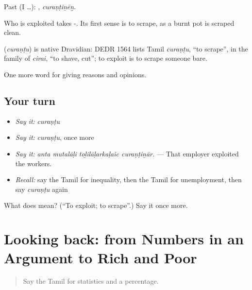 Past (I …): , \emph{curaṇṭiṉēṉ}.

Who is exploited takes -. Its first sense is to scrape, as a burnt pot is scraped clean.

\begin{cousinweb}
\textbf{} (\emph{curaṇṭu}) is native Dravidian: DEDR 1564 lists Tamil \emph{curaṇṭu}, \textquotedblleft{}to scrape\textquotedblright{}, in the family of \emph{cirai}, \textquotedblleft{}to shave, cut\textquotedblright{}; to exploit is to scrape someone bare.
\end{cousinweb}

\begin{grammarlens}[title={What you've built}]
One more word for giving reasons and opinions.
\end{grammarlens}

\subsection*{Your turn}
\begin{itemize}
\raggedright
  \item \emph{Say it:} \emph{curaṇṭu}
  \item \emph{Say it:} \emph{curaṇṭu}, once more
  \item \emph{Say it:} \emph{anta mutalāḷi toḻilāḷarkaḷaic curaṇṭiṉār.} — That employer exploited the workers.
  \item \emph{Recall:} say the Tamil for inequality, then the Tamil for unemployment, then say \emph{curaṇṭu} again
\end{itemize}

\begin{tcolorbox}[breakable,colback=teal!4,colframe=teal!35!black,title={Before you move on}]
What does  mean? (\textquotedblleft{}To exploit; to scrape\textquotedblright{}.) Say it once more.
\end{tcolorbox}
\section[(dialogue)]{Looking back: from Numbers in an Argument to Rich and Poor}

\label{lesson:TA-R370-review-363-370}



\begin{quote}
Say the Tamil for statistics and a percentage.
\end{quote}

